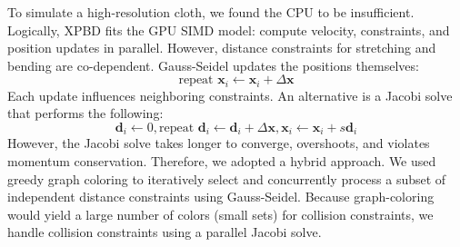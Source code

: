 \documentclass{article}
\begin{document}
To simulate a high-resolution cloth, we found the CPU to be insufficient. Logically, XPBD fits the GPU SIMD model: compute velocity, constraints, and position updates in parallel. However, distance constraints for stretching and bending are co-dependent. Gauss-Seidel updates the positions themselves:
\[\text{repeat }\textbf{x}_i \gets \textbf{x}_i + \Delta \textbf{x}\]
Each update influences neighboring constraints. An alternative is a Jacobi solve that performs the following: 
\[\textbf{d}_i \gets 0, \text{repeat }\textbf{d}_i \gets \textbf{d}_i + \Delta \textbf{x}, \textbf{x}_i \gets \textbf{x}_i + s\textbf{d}_i\]
However, the Jacobi solve takes longer to converge, overshoots, and violates momentum conservation. Therefore, we adopted a hybrid approach. We used greedy graph coloring to iteratively select and concurrently process a subset of independent distance constraints using Gauss-Seidel. Because graph-coloring would yield a large number of colors (small sets) for collision constraints, we handle collision constraints using a parallel Jacobi solve. 
\end{document}
